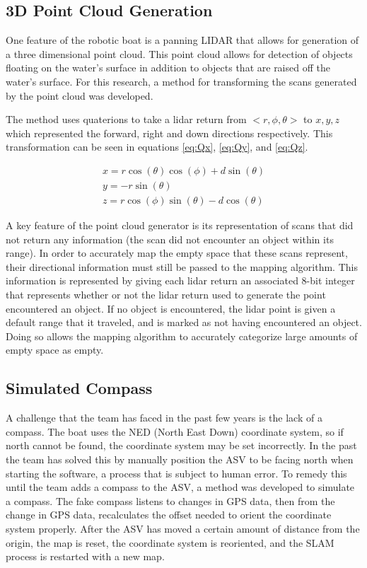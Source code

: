 \documentclass[10pt]{IEEEtran}
\begin{document}
\subsection{3D Point Cloud Generation}\label{pointcloud}
One feature of the robotic boat is a panning LIDAR that allows for generation of a three 
dimensional point cloud.  This point cloud allows for detection of objects floating on the
water's surface in addition to objects that are raised off the water's surface. 
For this research, a method for transforming the scans generated by the point cloud was 
developed.  

The method uses quaterions to take a lidar return from \(<r, \phi, \theta>\) to 
\(x,y,z\) which represented the forward, right and down directions respectively.  
This transformation can be seen in equations \ref{eq:Qx}, \ref{eq:Qy}, and \ref{eq:Qz}.

\begin{align}
	\label{eq:Qx}
	x = r\cos(\theta)\cos(\phi) + d \sin(\theta) \\
	\label{eq:Qy}
	y = -r \sin(\theta) \\
	\label{eq:Qz}
	z = r \cos(\phi)\sin(\theta) - d \cos(\theta) 
\end{align}

A key feature of the point cloud generator is its representation of scans that did not 
return any information (the scan did not encounter an object within its range).  In order
to accurately map the empty space that these scans represent, their directional information
must still be passed to the mapping algorithm.  This information is represented by giving
each lidar return an associated 8-bit integer that represents whether or not the lidar
return used to generate the point encountered an object.  If no object is encountered,
the lidar point is given a default range that it traveled, and is marked as not having 
encountered an object.  Doing so allows the mapping algorithm to accurately categorize 
large amounts of empty space as empty.

\subsection{Simulated Compass}
A challenge that the team has faced in the past few years is the lack of a compass.  
The boat uses the NED (North East Down) coordinate system, so if north cannot be found, 
the coordinate system may be set incorrectly.  In the past the team has solved this by
manually position the ASV to be facing north when starting the software,
a process that is subject to human error. To remedy this until the team adds a compass to the ASV,
a method was developed to simulate a compass.  The fake compass listens to changes in GPS
data, then from the change in GPS data, recalculates the offset needed to 
orient the coordinate system properly.  After the ASV has moved a certain amount
of distance from the origin, the map is reset, the coordinate system is reoriented,
and the SLAM process is restarted with a new map.
\end{document}
